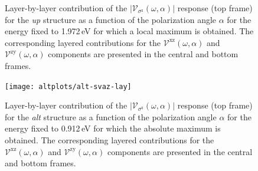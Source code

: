 \documentclass[prb,11pt,tightenlines,twocolumn,aps]{revtex4-1}
\begin{document}
\begin{figure}[t]
    \caption{Layer-by-layer contribution of the
    $|\mathcal{V}_{\sigma^{\mathrm{z}}}(\omega,\alpha)|$ response (top frame)
    for the \emph{up} structure as a function of the polarization angle $\alpha$
    for the energy fixed to 1.972\,eV for which a local maximum is obtained.
    The corresponding layered contributions for the
    $\mathcal{V}^{\mathrm{xz}}(\omega,\alpha)$ and
    $\mathcal{V}^{\mathrm{zy}}(\omega,\alpha)$ components are presented in the
    central and bottom frames.}
    \label{fig:up-vsz-lay-2}
\end{figure}

\begin{figure}[t]
    \centering
    \texttt{[image: altplots/alt-svaz-lay]}
    
\caption{Layer-by-layer contribution of the
    $|\mathcal{V}_{\sigma^{\mathrm{z}}}(\omega,\alpha)|$ response (top frame)
    for the \emph{alt} structure as a function of the polarization angle
    $\alpha$ for the energy fixed to 0.912\,eV for which the absolute maximum is
    obtained.
    The corresponding layered contributions for the
    $\mathcal{V}^{\mathrm{xz}}(\omega,\alpha)$ and
    $\mathcal{V}^{\mathrm{zy}}(\omega,\alpha)$ components are presented in the
    central and bottom frames.}
    \label{fig:alt-vsz-lay}
\end{figure}
% 
\end{document}
